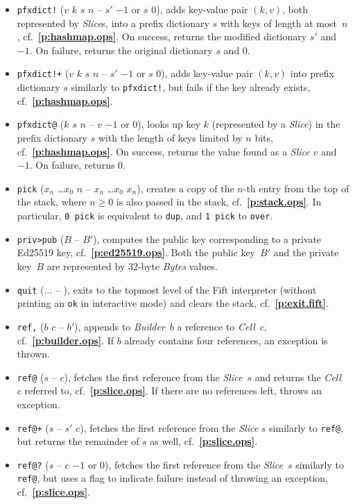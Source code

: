 \documentclass[12pt,oneside]{article}
\def\refpoint#1{{\rm\textbf{\ref{#1}}}}
\let\ptref=\refpoint
\begin{document}
\begin{itemize}
\item {\tt pfxdict!} ($v$ $k$ $s$ $n$ -- $s'$ $-1$ or $s$ $0$), adds key-value pair $(k,v)$, both represented by {\em Slice\/}s, into a prefix dictionary $s$ with keys of length at most~$n$, cf.~\ptref{p:hashmap.ops}. On success, returns the modified dictionary $s'$ and $-1$. On failure, returns the original dictionary $s$ and $0$.
\item {\tt pfxdict!+} ($v$ $k$ $s$ $n$ -- $s'$ $-1$ or $s$ $0$), adds key-value pair $(k,v)$ into prefix dictionary $s$ similarly to {\tt pfxdict!}, but fails if the key already exists, cf.~\ptref{p:hashmap.ops}.
\item {\tt pfxdict@} ($k$ $s$ $n$ -- $v$ $-1$ or $0$), looks up key $k$ (represented by a {\em Slice\/}) in the prefix dictionary $s$ with the length of keys limited by $n$ bits, cf.~\ptref{p:hashmap.ops}. On success, returns the value found as a {\em Slice\/} $v$ and $-1$. On failure, returns $0$.
\item {\tt pick} ($x_n$ \dots $x_0$ $n$ -- $x_n$ \dots $x_0$ $x_n$), creates a copy of the $n$-th entry from the top of the stack, where $n\geq0$ is also passed in the stack, cf.~\ptref{p:stack.ops}. In particular, {\tt 0 pick} is equivalent to {\tt dup}, and {\tt 1 pick} to {\tt over}.
\item {\tt priv>pub} ($B$ -- $B'$), computes the public key corresponding to a private Ed25519 key, cf.~\ptref{p:ed25519.ops}. Both the public key~$B'$ and the private key~$B$ are represented by 32-byte {\em Bytes\/} values.
\item {\tt quit} ($\dots$ -- ), exits to the topmost level of the Fift interpreter (without printing an {\tt ok} in interactive mode) and clears the stack, cf.~\ptref{p:exit.fift}.
\item {\tt ref,} ($b$ $c$ -- $b'$), appends to {\em Builder\/}~$b$ a reference to {\em Cell\/}~$c$, cf.~\ptref{p:builder.ops}. If $b$ already contains four references, an exception is thrown.
\item {\tt ref@} ($s$ -- $c$), fetches the first reference from the {\em Slice\/}~$s$ and returns the {\em Cell}~$c$ referred to, cf.~\ptref{p:slice.ops}. If there are no references left, throws an exception.
\item {\tt ref@+} ($s$ -- $s'$ $c$), fetches the first reference from the {\em Slice\/} $s$ similarly to {\tt ref@}, but returns the remainder of $s$ as well, cf.~\ptref{p:slice.ops}.
\item {\tt ref@?} ($s$ -- $c$ $-1$ or $0$), fetches the first reference from the {\em Slice}~$s$ similarly to {\tt ref@}, but uses a flag to indicate failure instead of throwing an exception, cf.~\ptref{p:slice.ops}.

\end{itemize}
\end{document}
